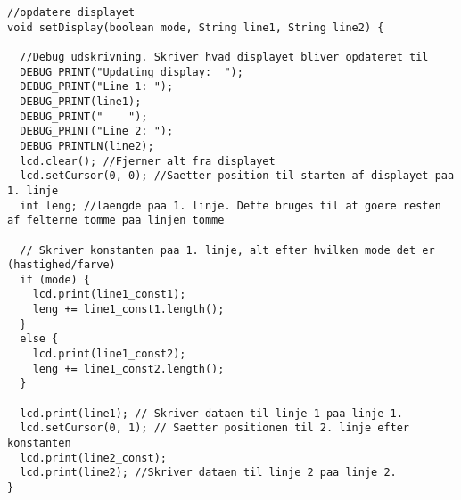 \begin{lstlisting}
//opdatere displayet
void setDisplay(boolean mode, String line1, String line2) {

  //Debug udskrivning. Skriver hvad displayet bliver opdateret til
  DEBUG_PRINT("Updating display:  ");
  DEBUG_PRINT("Line 1: ");
  DEBUG_PRINT(line1);
  DEBUG_PRINT("    ");
  DEBUG_PRINT("Line 2: ");
  DEBUG_PRINTLN(line2);
  lcd.clear(); //Fjerner alt fra displayet
  lcd.setCursor(0, 0); //Saetter position til starten af displayet paa 1. linje
  int leng; //laengde paa 1. linje. Dette bruges til at goere resten af felterne tomme paa linjen tomme

  // Skriver konstanten paa 1. linje, alt efter hvilken mode det er (hastighed/farve)
  if (mode) {
    lcd.print(line1_const1);
    leng += line1_const1.length();
  }
  else {
    lcd.print(line1_const2);
    leng += line1_const2.length();
  }

  lcd.print(line1); // Skriver dataen til linje 1 paa linje 1.
  lcd.setCursor(0, 1); // Saetter positionen til 2. linje efter konstanten
  lcd.print(line2_const);
  lcd.print(line2); //Skriver dataen til linje 2 paa linje 2.
}
\end{lstlisting}

